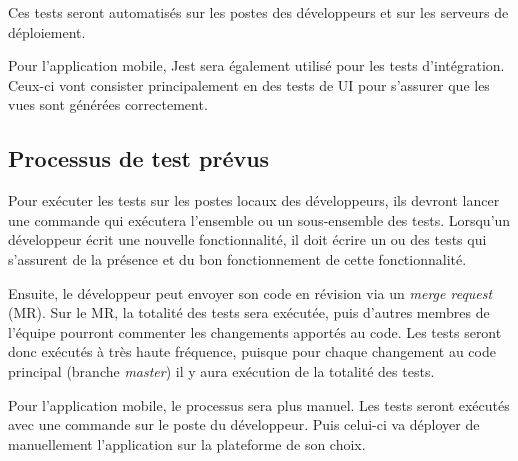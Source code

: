 	Ces tests seront automatisés sur les postes des développeurs et sur les serveurs de déploiement.

	Pour l’application mobile, Jest sera également utilisé pour les tests d’intégration. Ceux-ci vont consister principalement en des tests de UI pour s’assurer que les vues sont générées correctement. 

	\subsection{Processus de test prévus}
	Pour exécuter les tests sur les postes locaux des développeurs, ils devront lancer une commande qui exécutera l’ensemble ou un sous-ensemble des tests. Lorsqu’un développeur écrit une nouvelle fonctionnalité, il doit écrire un ou des tests qui s’assurent de la présence et du bon fonctionnement de cette fonctionnalité. 

	Ensuite, le développeur peut envoyer son code en révision via un \emph{merge request} (MR). Sur le MR, la totalité des tests sera exécutée, puis d’autres membres de l’équipe pourront commenter les changements apportés au code. Les tests seront donc exécutés à très haute fréquence, puisque pour chaque changement au code principal (branche \emph{master}) il y aura exécution de la totalité des tests. 

	Pour l’application mobile, le processus sera plus manuel. Les tests seront exécutés avec une commande sur le poste du développeur. Puis celui-ci va déployer de manuellement l’application sur la plateforme de son choix.
